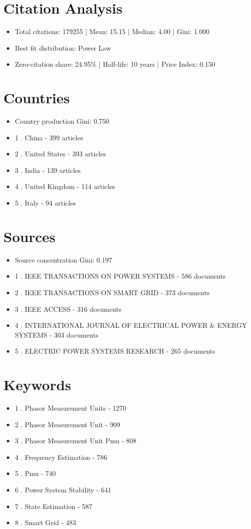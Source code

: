 \documentclass[12pt]{article}
\begin{document}
\section*{Citation Analysis}
\begin{itemize}
\item Total citations: 179255 | Mean: 15.15 | Median: 4.00 | Gini: 1.000
\item Best fit distribution: Power Law
\item Zero-citation share: 24.95\% | Half-life: 10 years | Price Index: 0.150
\end{itemize}
\section*{Countries}
\begin{itemize}
\item Country production Gini: 0.750
\item 1 . China - 399 articles
\item 2 . United States - 393 articles
\item 3 . India - 139 articles
\item 4 . United Kingdom - 114 articles
\item 5 . Italy - 94 articles
\end{itemize}
\section*{Sources}
\begin{itemize}
\item Source concentration Gini: 0.197
\item 1 . IEEE TRANSACTIONS ON POWER SYSTEMS - 586 documents
\item 2 . IEEE TRANSACTIONS ON SMART GRID - 373 documents
\item 3 . IEEE ACCESS - 316 documents
\item 4 . INTERNATIONAL JOURNAL OF ELECTRICAL POWER \& ENERGY SYSTEMS - 303 documents
\item 5 . ELECTRIC POWER SYSTEMS RESEARCH - 265 documents
\end{itemize}
\section*{Keywords}
\begin{itemize}
\item 1 . Phasor Measurement Units - 1270
\item 2 . Phasor Measurement Unit - 909
\item 3 . Phasor Measurement Unit Pmu - 808
\item 4 . Frequency Estimation - 786
\item 5 . Pmu - 740
\item 6 . Power System Stability - 641
\item 7 . State Estimation - 587
\item 8 . Smart Grid - 483
\end{itemize}
\end{document}
